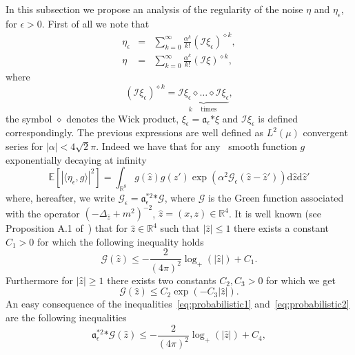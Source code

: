 \documentclass[a4paper,10pt]{article}
\newcommand{\asterisk}{\mathord{*}}
\newcommand{\mathd}{\mathrm{d}}
\newcommand{\tmop}[1]{\ensuremath{\operatorname{#1}}}
\begin{document}
In this subsection we propose an analysis of the regularity of the noise
$\eta$ and $\eta_{\epsilon}$, for $\epsilon > 0$. First of all we note that
\begin{eqnarray}
  \eta_{\epsilon} & = & \sum_{k = 0}^{\infty} \frac{\alpha^k}{k!} (\mathcal{I}
  \xi_{\epsilon})^{\diamond k},  \label{eq:noise1}\\
  \eta & = & \sum_{k = 0}^{\infty} \frac{\alpha^k}{k!} (\mathcal{I}
  \xi)^{\diamond k},  \label{eq:noise2}
\end{eqnarray}
where
\[ (\mathcal{I} \xi_{\epsilon})^{\diamond k} = \underbrace{\mathcal{I}
   \xi_{\epsilon} \diamond \ldots \diamond \mathcal{I} \xi_{\epsilon}}_{k
   \quad \tmop{times}} {}, \]
the symbol $\diamond$ denotes the Wick product, $\xi_{\epsilon} =
\mathfrak{a}_{\epsilon} \asterisk \xi$ and $\mathcal{I} \xi_{\epsilon}$ is
defined correspondingly. The previous expressions are well defined as $L^2
(\mu)$ convergent series for $| \alpha | < 4 \sqrt{2} \pi$. Indeed we have
that for any \ smooth function $g$ exponentially decaying at infinity \
\begin{equation}
  \mathbb{E} [| \langle \eta_{\epsilon}, g \rangle |^2] = \int_{\mathbb{R}^8}
  g (\hat{z}) g (\hat{z}') \exp (\alpha^2 \mathcal{G}_{\epsilon} (\hat{z} -
  \hat{z}')) \mathd \hat{z} \mathd \hat{z}' \label{eq:noise3}
\end{equation}
where, hereafter, we write $\mathcal{G}_{\epsilon} = \mathfrak{a}^{\asterisk
2}_{\epsilon} \asterisk \mathcal{G}$, where $\mathcal{G}$ is the Green
function associated with the operator $(- \Delta_{\hat{z}} + m^2)^{- 2}$,
$\hat{z} = (x, z) \in \mathbb{R}^4$. It is well known (see Proposition A.1
of~{\cite{Albeverio2002}}) that for $\hat{z} \in \mathbb{R}^4$ such that $|
\hat{z} | \leqslant 1$ there exists a constant $C_1 > 0$ for which the
following inequality holds
\begin{equation}
  \mathcal{G} (\hat{z}) \leqslant - \frac{2}{(4 \pi)^2} \log_+ (| \hat{z} |) +
  C_1 \label{eq:probabilistic1} .
\end{equation}
Furthermore for $| \hat{z} | \geqslant 1$ there exists two constants $C_2, C_3
> 0$ for which we get
\begin{equation}
  \mathcal{G} (\hat{z}) \leqslant C_2 \exp (- C_3 | \hat{z} |)
  \label{eq:probabilistic2} .
\end{equation}
An easy consequence of the inequalities~{\eqref{eq:probabilistic1}}
and~{\eqref{eq:probabilistic2}} are the following inequalities
\begin{equation}
  \mathfrak{a}_{\epsilon}^{\asterisk 2} \asterisk \mathcal{G} (\hat{z})
  \leqslant - \frac{2}{(4 \pi)^2} \log_+ (| \hat{z} |) + C_4,
  \label{eq:probabilistic3}
\end{equation}
\end{document}
